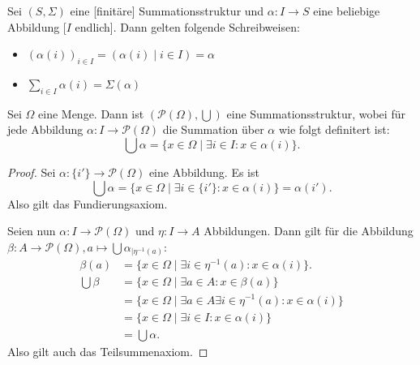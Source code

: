 \documentclass{article}
\begin{document}
\begin{definition}
  Sei $(S, \Sigma)$ eine [finitäre] Summationsstruktur und ${\alpha \colon I \to S}$
  eine beliebige Abbildung [$I$ endlich]. 
  Dann gelten folgende Schreibweisen:
  \begin{itemize}
    \item $(\alpha(i))_{i \in I} = (\alpha(i) \mid i \in I) = \alpha$
    \item $\sum_{i \in I} \alpha(i) = \Sigma(\alpha)$
  \end{itemize}
\end{definition}

\begin{theorem}
  Sei $\Omega$ eine Menge. Dann ist $(\mathcal{P}(\Omega), \bigcup)$ eine Summationsstruktur,
  wobei für jede Abbildung $\alpha \colon I \to \mathcal{P}(\Omega)$ die Summation über $\alpha$ wie folgt
  definitert ist:
  \begin{equation*}
    \bigcup \alpha = \{ x \in \Omega \mid \exists i \in I \colon x \in \alpha(i) \}.
  \end{equation*}
\end{theorem}
\begin{proof}
  Sei $\alpha \colon \{ i' \} \to \mathcal{P}(\Omega)$ eine Abbildung.
  Es ist
  \begin{equation*}
    \bigcup \alpha = \{ x \in \Omega \mid \exists i \in \{i'\} \colon x \in \alpha(i) \}
    = \alpha(i').
  \end{equation*}
  Also gilt das Fundierungsaxiom.

  Seien nun $\alpha \colon I \to \mathcal{P}(\Omega)$ und $\eta \colon I \to A$ Abbildungen.
  Dann gilt für die Abbildung 
  $\beta \colon A \to \mathcal{P}(\Omega), a \mapsto \bigcup \alpha_{\mid \eta^{-1}(a)}$:
  \begin{align*}
    \beta(a) &= \{ x \in \Omega \mid \exists i \in \eta^{-1}(a) \colon x \in \alpha(i) \}.\\
    \bigcup \beta &= \{ x \in \Omega \mid \exists a \in A \colon x \in \beta(a) \}\\
    &= \{ x \in \Omega \mid \exists a \in A \exists i \in \eta^{-1}(a) \colon x \in \alpha(i) \}\\
    &= \{ x \in \Omega \mid \exists i \in I \colon x \in \alpha(i) \}\\
    &= \bigcup \alpha.
  \end{align*}
  Also gilt auch das Teilsummenaxiom.
\end{proof}
\end{document}
